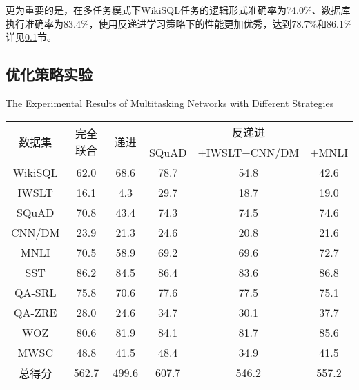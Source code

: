 更为重要的是，在多任务模式下WikiSQL任务的逻辑形式准确率为74.0\%、数据库执行准确率为83.4\%，使用反递进学习策略下的性能更加优秀，达到78.7\%和86.1\%详见\ref{cnl2sql:btyhclxdsyjg}节。

\subsection{优化策略实验}
\label{cnl2sql:btyhclxdsyjg}

\begin{table}[!htpb]
    {The Experimental Results of Multitasking Networks with Different Strategies}
  \label{tab:drwwlzbtxlclxdsyjg}
  \centering
  \begin{threeparttable}[b]
     \begin{tabular}{cccccc}
      \toprule
      \multirow{2}{18mm}{数据集}&\multirow{2}{18mm}{完全联合}&\multirow{2}{18mm}{递进} & \multicolumn{3}{c}{反递进}\\
      \cmidrule(lr){4-6}
      & & & SQuAD & +IWSLT+CNN/DM & +MNLI\\
      \midrule
      WikiSQL & 62.0 & 68.6 & 78.7 & 54.8 & 42.6\\
      IWSLT & 16.1 & 4.3 & 29.7 & 18.7 & 19.0\\
      SQuAD & 70.8 & 43.4 & 74.3 & 74.5 & 74.6\\
      CNN/DM & 23.9 & 21.3 & 24.6 & 20.8 & 21.6\\
      MNLI & 70.5 & 58.9 & 69.2 & 69.6 & 72.7\\
      SST & 86.2 & 84.5 & 86.4 & 83.6 & 86.8\\
      QA-SRL & 75.8 & 70.6 & 77.6 & 77.5 & 75.1\\
      QA-ZRE & 28.0 & 24.6 & 34.7 & 30.1 & 37.7\\
      WOZ & 80.6 & 81.9 & 84.1 & 81.7 & 85.6\\
    
      MWSC & 48.8 & 41.5 & 48.4 & 34.9 & 41.5\\
      \midrule
      总得分 & 562.7 & 499.6 & 607.7 & 546.2 & 557.2\\
      \bottomrule
    \end{tabular}
  \end{threeparttable}
\end{table}


